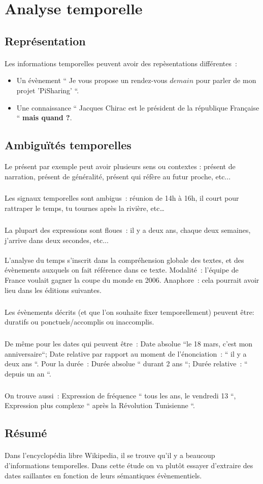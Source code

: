 \section*{Analyse temporelle}
\subsection*{Représentation}
\paragraph{}
Les informations temporelles peuvent avoir des repèsentations différentes~: 
\begin{itemize}
\item Un évènement `` Je vous propose un rendez-vous $demain$ pour parler de mon projet 'PiSharing' ``. \item Une connaissance `` Jacques Chirac est le président de la république Française `` \textbf{ mais quand ?}.
\end{itemize}
\subsection*{Ambiguïtés temporelles}
Le présent par exemple peut avoir plusieurs sens ou contextes : présent de narration, présent de généralité, présent qui réfère au futur proche, etc...
\subparagraph{}
Les signaux temporelles sont ambigus~: réunion de 14h à 16h, il court pour rattraper le temps, tu tournes après la rivière, etc…
\subparagraph{}
La plupart des expressions sont floues~: il y a deux ans, chaque deux semaines, j’arrive dans deux secondes, etc...
\paragraph{}
L’analyse du temps s’inscrit dans la compréhension globale des textes, et des évènements auxquels on fait référence dans ce texte. 
\newline
Modalité~: l’équipe de France voulait gagner la coupe du monde en 2006. 
\newline
Anaphore~: cela pourrait avoir lieu dans les éditions suivantes.
\subparagraph{}
Les évènements décrits (et que l’on souhaite fixer temporellement) peuvent être: duratifs ou ponctuels/accomplis ou inaccomplis. 
\subparagraph{}
De même pour les dates qui peuvent être~: Date absolue ``le 18 mars, c'est mon anniversaire``; Date relative par rapport au moment de l’énonciation~: `` il y a deux ans ``. Pour la durée~: Durée absolue `` durant 2 ans ``; Durée relative~: `` depuis un an ``.
\subparagraph{}
On trouve aussi~: Expression de fréquence `` tous les ans, le vendredi 13 ``, Expression plus complexe `` après la Révolution Tunisienne ``.
\subsection*{Résumé}
\paragraph{}
Dans l'encyclopédia libre Wikipedia, il se trouve qu’il y a beaucoup d’informations temporelles. Dans cette étude on va plutôt essayer d’extraire des dates saillantes en fonction de leurs sémantiques évènementiels.